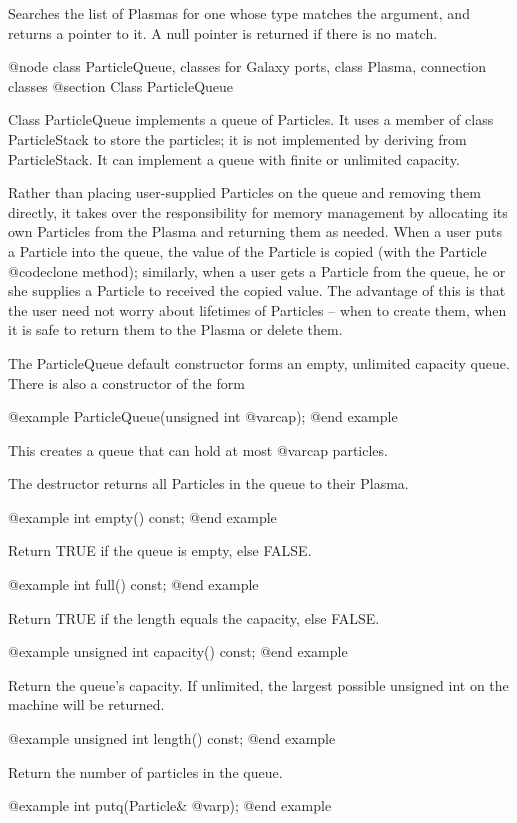 Searches the list of Plasmas for one whose type matches the argument,
and returns a pointer to it.  A null pointer is returned if there is
no match.

@node class ParticleQueue, classes for Galaxy ports, class Plasma, connection classes
@section Class ParticleQueue

Class ParticleQueue implements a queue of Particles.  It uses a member
of class ParticleStack to store the particles; it is not implemented
by deriving from ParticleStack.  It can implement a queue with finite
or unlimited capacity.

Rather than placing user-supplied Particles on the queue and removing
them directly, it takes over the responsibility for memory management
by allocating its own Particles from the Plasma and returning them
as needed.  When a user puts a Particle into the queue, the value of
the Particle is copied (with the Particle @code{clone} method);
similarly, when a user gets a Particle from the queue, he or she
supplies a Particle to received the copied value.  The advantage of
this is that the user need not worry about lifetimes of Particles --
when to create them, when it is safe to return them to the Plasma
or delete them.

The ParticleQueue default constructor forms an empty, unlimited capacity
queue.  There is also a constructor of the form

@example
ParticleQueue(unsigned int @var{cap});
@end example

This creates a queue that can hold at most @var{cap} particles.

The destructor returns all Particles in the queue to their Plasma.

@example
int empty() const;
@end example

Return TRUE if the queue is empty, else FALSE.

@example
int full() const;
@end example

Return TRUE if the length equals the capacity, else FALSE.

@example
unsigned int capacity() const;
@end example

Return the queue's capacity.  If unlimited, the largest possible
unsigned int on the machine will be returned.

@example
unsigned int length() const;
@end example

Return the number of particles in the queue.

@example
int putq(Particle& @var{p});
@end example

